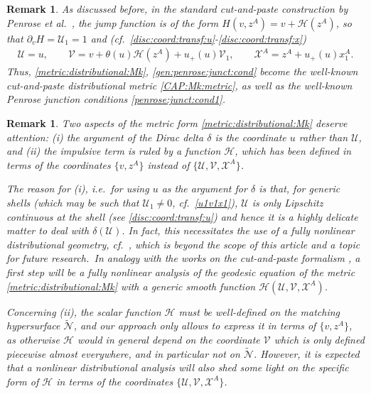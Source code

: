 \documentclass[11pt]{article}
\numberwithin{equation}{section}
\newtheorem{remark}[theorem]{Remark}
\newcommand{\cx}{\mathcal{X}}
\newcommand{\heav}{\theta(u)}
\newcommand{\up}{u_{+}(u)}
\newcommand\N{\mathcal N}
\newcommand{\cp}{\partial}
\newcommand{\lp}{\left(}
\newcommand{\rp}{\right)}
\newcommand{\cu}{\mathcal{U}}
\newcommand{\cv}{\mathcal{V}}
\newcommand{\nullhyp}{\widetilde{\N}}
\newcommand{\hor}{\mathscr{H}}
\begin{document}
\begin{remark}
As discussed before, in the standard cut-and-paste construction by Penrose et al.\ \textup{\cite{penrose1968twistor,Penrose:1972xrn,podolsky2017penrose}}, the jump function is of the form $H(v,z^A)=v+\mathcal{H}(z^A)$, so that $\cp_vH=\cu_1=1$ and (cf.\ \eqref{disc:coord:transf:u}-\eqref{disc:coord:transf:x})
\begin{align}
\cu= u,\qquad \cv= v+\heav\mathcal{H}(z^A)+\up\cv_1,\qquad \cx^A= z^A+\up x_1^A.
\end{align}
Thus, \eqref{metric:distributional:Mk}, \eqref{gen:penrose:junct:cond} become 
the well-known cut-and-paste distributional metric \eqref{CAP:Mk:metric}, 
as well as the well-known Penrose junction conditions \eqref{penrose:junct:cond1}.\ 
\end{remark}

\begin{remark}
Two aspects of the metric form \eqref{metric:distributional:Mk} deserve attention: (i) the argument of the Dirac delta $\delta$ is the coordinate $u$ rather than $\cu$, and (ii) the impulsive term is ruled by a function $\hor$, which has been defined in terms of the coordinates $\{v,z^A\}$ instead of $\{\cu,\cv,\cx^A\}$.

The reason for (i), i.e.\ for using $u$ as the argument for $\delta$ is that, for generic shells (which may be such that $\cu_1\neq0$, cf.\ \eqref{u1v1x1}), $\cu$ is only Lipschitz continuous at the shell (see \eqref{disc:coord:transf:u}) and hence it is a highly delicate matter to deal with $\delta\lp\cu\rp$. In fact, this necessitates the use of a fully nonlinear distributional geometry, cf.\ \textup{\cite[Ch.\ 3]{grosser2013geometric}}, which is beyond the scope of this article and a topic for future research.\ In analogy with the works on the cut-and-paste formalism \textup{\cite{SSLP:16,SS:17}}, a first step will be a fully nonlinear analysis of the geodesic equation of the metric \eqref{metric:distributional:Mk} with a generic smooth function $\hor(\cu,\cv,\cx^A)$.


Concerning (ii), the scalar function $\hor$ must be well-defined on the matching hypersurface $\nullhyp$,  
and our approach only allows to express it in terms of $\{v, z^A\}$, as otherwise $\hor$ would in general depend on the coordinate $\cv$
which is only defined piecewise almost everywhere, and in particular not on $\nullhyp$. However, it is expected that a nonlinear distributional analysis will also shed some light on the specific form of $\hor$ in terms of the coordinates $\{\cu,\cv,\cx^A\}$.
\end{remark}
\end{document}
